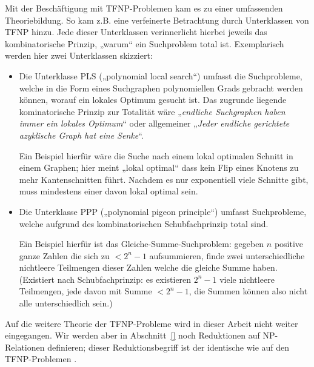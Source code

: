 Mit der Beschäftigung mit TFNP-Problemen kam es zu einer umfassenden Theoriebildung. So kam z.B. eine verfeinerte Betrachtung durch Unterklassen von TFNP hinzu. Jede dieser Unterklassen verinnerlicht hierbei jeweils das kombinatorische Prinzip, „warum“ ein Suchproblem total ist. Exemplarisch werden hier zwei Unterklassen skizziert:
\begin{itemize}
    \item Die Unterklasse PLS („polynomial local search“) umfasst die Suchprobleme, welche in die Form eines Suchgraphen polynomiellen Grads gebracht werden können, worauf ein lokales Optimum gesucht ist.
    Das zugrunde liegende kominatorische Prinzip zur Totalität wäre „\emph{endliche Suchgraphen haben immer ein lokales Optimum}“ oder allgemeiner „\emph{Jeder endliche gerichtete azyklische Graph hat eine Senke}“.

    Ein Beispiel hierfür wäre die Suche nach einem lokal optimalen Schnitt in einem Graphen; hier meint „lokal optimal“ dass kein Flip eines Knotens zu mehr Kantenschnitten führt. Nachdem es nur exponentiell viele Schnitte gibt, muss mindestens einer davon lokal optimal sein.

    \item Die Unterklasse PPP („polynomial pigeon principle“) umfasst Suchprobleme, welche aufgrund des kombinatorischen Schubfachprinzip total sind. 

        Ein Beispiel hierfür ist das Gleiche-Summe-Suchproblem: gegeben $n$ positive ganze Zahlen die sich zu $<2^n-1$ aufsummieren, finde zwei unterschiedliche nichtleere Teilmengen dieser Zahlen welche die gleiche Summe haben. (Existiert nach Schubfachprinzip: es existieren $2^n-1$ viele nichtleere Teilmengen, jede davon mit Summe $<2^n-1$, die Summen können also nicht alle unterschiedlich sein.)
\end{itemize}
Auf die weitere Theorie der TFNP-Probleme wird in dieser Arbeit nicht weiter eingegangen. Wir werden aber in Abschnitt~\ref{} noch Reduktionen auf NP-Relationen definieren; dieser Reduktionsbegriff ist der identische wie auf den TFNP-Problemen \textcite{megiddo_total_1991}.



